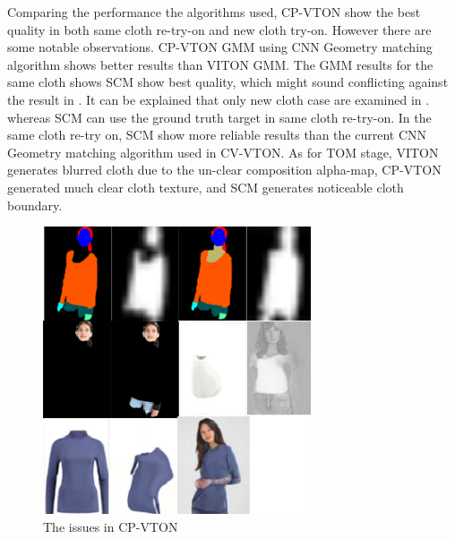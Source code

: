 Comparing the performance the algorithms used, CP-VTON show the best quality in both same cloth re-try-on and new cloth try-on. However there are some notable observations. CP-VTON GMM using CNN Geometry matching algorithm shows better results than VITON GMM. The GMM results for the same cloth shows SCM show best quality, which might sound conflicting against the result in \cite{Wang2018TowardCI}. It can be explained that only new cloth case are examined in \cite{Wang2018TowardCI}. whereas SCM can use the ground truth target in same cloth re-try-on.  In the same cloth re-try on, SCM show more reliable results than the current CNN Geometry matching algorithm used in CV-VTON.       
As for TOM stage, VITON generates blurred cloth due to the un-clear composition alpha-map, CP-VTON generated much clear cloth texture, and SCM generates noticeable cloth boundary.     




\begin{figure}
\centering
\includegraphics[height=8.5cm, scale=1]{figures/cpvtonissues.png}   %
\caption{The issues in CP-VTON}
\label{fig:cpvtonissues}
\end{figure}

